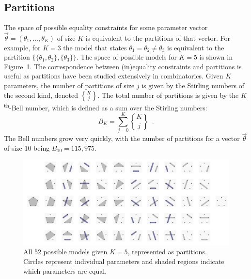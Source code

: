 \documentclass[11pt,a4paper]{article}
\theoremstyle{definition} %
\theoremstyle{case}
\DeclareRobustCommand{\stirling}{\genfrac\{\}{0pt}{}}
\newcommand{\bellnum}[1]{B_{#1}}
\begin{document}
\subsection{Partitions}
The space of possible equality constraints for some parameter vector $\vec{\theta} = (\theta_1, \ldots, \theta_K)$ of size $K$ is equivalent to the partitions of that vector. For example, for $K = 3$ the model that states $\theta_1 = \theta_2 \neq \theta_3$ is equivalent to the partition $\{\{\theta_1, \theta_2\}, \{\theta_3\}\}$. The space of possible models for $K = 5$ is shown in Figure~\ref{fig:partitions}. The correspondence between (in)equality constraints and partitions is useful as partitions have been studied extensively in combinatorics. Given $K$ parameters, the number of partitions of size $j$ is given by the Stirling numbers of the second kind, denoted $\stirling{K}{j}$. The total number of partitions is given by the $K$\textsuperscript{th}-Bell number, which is defined as a sum over the Stirling numbers:
\begin{equation}
    \bellnum{K} = \sum_{j = 0}^K \stirling{K}{j} \enspace .
\end{equation}
The Bell numbers grow very quickly, with the number of partitions for a vector $\vec{\theta}$ of size 10 being $B_{10} = 115,975$. %

\begin{figure}
    \centering
    \includegraphics[width = \textwidth, keepaspectratio]{modelspace_5_horizontal.pdf}
    \caption{All 52 possible models given $K = 5$, represented as partitions. Circles represent individual parameters and shaded regions indicate which parameters are equal.}
    \label{fig:partitions}
\end{figure}
\end{document}
